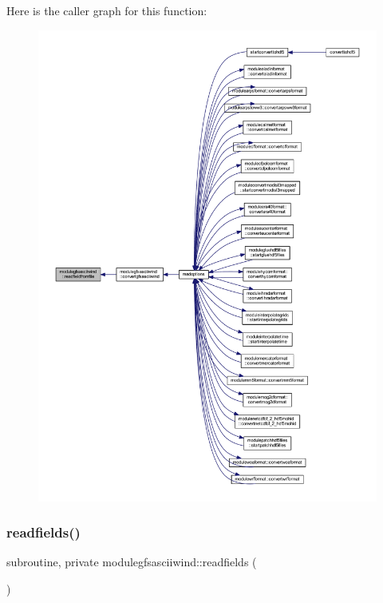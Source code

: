 Here is the caller graph for this function\+:\nopagebreak
\begin{figure}[H]
\begin{center}
\leavevmode
\includegraphics[width=350pt]{namespacemodulegfsasciiwind_a69fe620e0a4b751e1ee827c3e8f01e6c_icgraph}
\end{center}
\end{figure}
\mbox{\label{namespacemodulegfsasciiwind_ac5d334e8c6ff65db3f44823f9a106515}} 
\subsubsection{\texorpdfstring{readfields()}{readfields()}}
{\footnotesize\ttfamily subroutine, private modulegfsasciiwind\+::readfields (\begin{DoxyParamCaption}{ }\end{DoxyParamCaption})\hspace{0.3cm}{\ttfamily [private]}}

